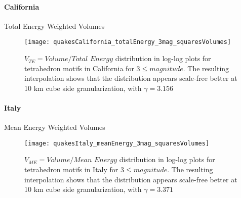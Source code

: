 \paragraph{California} Total Energy Weighted Volumes
\begin{figure}[!h]

  \centering
  \texttt{[image: quakesCalifornia\_totalEnergy\_3mag\_squaresVolumes]}

\caption{$V_{TE} = Volume/Total$ $Energy$ distribution in log-log plots for tetrahedron motifs in California for $3 \leq magnitude$. The resulting interpolation shows that the distribution appears scale-free better at 10 km cube side granularization, with $\gamma = 3.156$}
\label{fig:tetrahedronsVolumesCaTE}
\end{figure}


\paragraph{Italy} Mean Energy Weighted Volumes
\begin{figure}[!h]

  \centering
  \texttt{[image: quakesItaly\_meanEnergy\_3mag\_squaresVolumes]}

\caption{$V_{ME} = Volume/Mean$ $Energy$ distribution in log-log plots for tetrahedron motifs in Italy for $3 \leq magnitude$. The resulting interpolation shows that the distribution appears scale-free  better at 10 km cube side granularization, with $\gamma = 3.371$}
\label{fig:tetrahedronsVolumesItME}
\end{figure}



